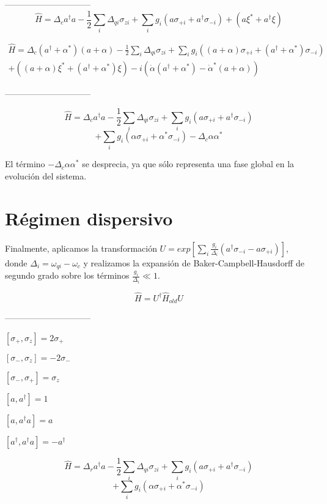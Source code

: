 ------------------------------
$$ \hat{H} = \Delta_c a^\dagger a - \frac{1}{2} \sum\limits_i \Delta_{qi} \sigma_{zi} + \sum\limits_i g_i (a \sigma_{+ i} + a^\dagger \sigma_{- i}) + (a\xi^*+a^\dagger\xi )$$

\begin{align*}
  \hat{H} = \Delta_c (a^\dagger + \alpha^*) (a + \alpha) - \frac{1}{2} \sum\limits_i \Delta_{qi} \sigma_{zi} + \sum\limits_i g_i ((a+\alpha) \sigma_{+ i} + (a^\dagger+\alpha^*) \sigma_{- i}) \\
  + ((a+\alpha)\xi^*+(a^\dagger+\alpha^*)\xi ) -i(\dot{\alpha} (a^\dagger + \alpha^*) - \dot{\alpha}^* (a + \alpha))
\end{align*}


------------------------------

$$\hat{H} = \Delta_c a^\dagger a - \frac{1}{2} \sum\limits_i \Delta_{qi} \sigma_{zi} + \sum\limits_i g_i (a \sigma_{+i} + a^\dagger \sigma_{-i})$$
$$ + \sum\limits_i g_i (\alpha \sigma_{+i} + \alpha^* \sigma_{-i}) - \Delta_c \alpha \alpha^* $$

El término $-\Delta_c \alpha \alpha^*$ se desprecia, ya que sólo representa una fase global en la evolución del sistema.

\section{Régimen dispersivo}

Finalmente, aplicamos la transformación $U = exp[\sum\limits_i \frac{g_i}
{\Delta_i} (a^\dagger \sigma_{-i} - a \sigma_{+i})]$, donde $\Delta_i =
\omega_{qi} - \omega_c$ y realizamos la expansión de Baker-Campbell-Hausdorff de segundo grado sobre los términos $\frac{g_i}{\Delta_i} \ll 1$.

$$\hat{H} = U^\dagger \hat{H}_{old} U$$

------------------------------

$[\sigma_+, \sigma_z] = 2 \sigma_+$

$[\sigma_-, \sigma_z] = - 2 \sigma_-$

$[\sigma_-, \sigma_+] = \sigma_z$

$[a, a^\dagger] = 1$

$[a, a^\dagger a] = a$

$[a^\dagger, a^\dagger a] = -a^\dagger$

$$\hat{H} = \Delta_r a^\dagger a - \frac{1}{2} \sum\limits_i \Delta_{qi} \sigma_{zi} + \sum\limits_i g_i (a \sigma_{+i} + a^\dagger \sigma_{-i})$$
$$ + \sum\limits_i g_i (\alpha \sigma_{+i} + \alpha^* \sigma_{-i})$$

